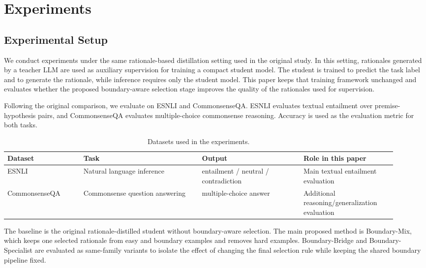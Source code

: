 \section{Experiments}
\label{sec:experiments}

\subsection{Experimental Setup}
\label{sec:experimental-setup}

We conduct experiments under the same rationale-based distillation setting used in the original study. In this setting, rationales generated by a teacher LLM are used as auxiliary supervision for training a compact student model. The student is trained to predict the task label and to generate the rationale, while inference requires only the student model. This paper keeps that training framework unchanged and evaluates whether the proposed boundary-aware selection stage improves the quality of the rationales used for supervision.

Following the original comparison, we evaluate on ESNLI and CommonsenseQA. ESNLI evaluates textual entailment over premise-hypothesis pairs, and CommonsenseQA evaluates multiple-choice commonsense reasoning. Accuracy is used as the evaluation metric for both tasks.

\begin{table}[H]
\centering
\caption{Datasets used in the experiments.}
\label{tab:experiment-datasets}
\begin{tabular}{p{0.18\linewidth} p{0.28\linewidth} p{0.24\linewidth} p{0.22\linewidth}}
\hline
Dataset & Task & Output & Role in this paper \\
\hline
ESNLI & Natural language inference & entailment / neutral / contradiction & Main textual entailment evaluation \\
\hline
CommonsenseQA & Commonsense question answering & multiple-choice answer & Additional reasoning/generalization evaluation \\
\hline
\end{tabular}
\end{table}

The baseline is the original rationale-distilled student without boundary-aware selection. The main proposed method is Boundary-Mix, which keeps one selected rationale from easy and boundary examples and removes hard examples. Boundary-Bridge and Boundary-Specialist are evaluated as same-family variants to isolate the effect of changing the final selection rule while keeping the shared boundary pipeline fixed.

